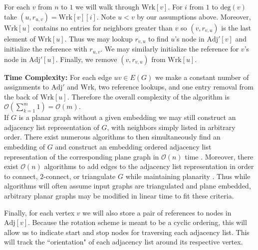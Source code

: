 \documentclass[letterpaper, 12pt]{amsart}
\theoremstyle{definition}
\theoremstyle{definition}
\theoremstyle{thm}
\theoremstyle{definition}
\begin{document}
For each $v$ from $n$ to $1$ we will walk through $\text{Wrk}[v]$. For $i$ from
$1$ to $\text{deg}(v)$ take $(u,r_{u,v})=\text{Wrk}[v][i]$. Note $u<v$ by our
assumptions above. Moreover, $\text{Wrk}[u]$ contains no entries for neighbors
greater than $v$ so $(v,r_{v,u})$ is the last element of $\text{Wrk}[u]$. Thus
we may lookup $r_{v,u}$ to find $u$'s node in $\text{Adj}'[v]$ and initialize the
reference with $r_{u,v}$. We may similarly initialize the reference for $v$'s
node in $\text{Adj}'[u]$. Finally, we remove $(v,r_{v,u})$ from $\text{Wrk}[u]$.

\noindent\textbf{Time Complexity:} For each edge $uv\in E(G)$ we make a constant
number of assignments to $\text{Adj}'$ and $\text{Wrk}$, two reference
lookups, and one entry removal from the back of $\text{Wrk}[u]$.
Therefore the overall complexity of the algorithm is
$\mathcal{O}\left(\sum_{k=1}^m 1\right)=\mathcal{O}(m)$.\\

If $G$ is a planar graph without a given embedding we may still construct an
adjacency list representation of $G$, with neighbors simply listed in arbitrary
order. There exist numerous algorithms to then simultaneously find an embedding
of $G$ and construct an embedding ordered adjacency list representation of the
corresponding plane graph in $\mathcal{O}(n)$ time \cite{tarjan, lempel, boyer,
booth}. Moreover, there exist $\mathcal{O}(n)$ algorithms to add edges
to the adjacency list representation in order to connect, $2$-connect, or
triangulate $G$ while maintaining planarity \cite{hagerup,reed,eswaran}. Thus
while algorithms will often assume input graphs are triangulated and plane
embedded, arbitrary planar graphs may be modified in linear time to fit these
criteria.

Finally, for each vertex $v$ we will also store a pair of references to nodes in
$\text{Adj}[v]$. Because the rotation scheme is meant to be a cyclic ordering,
this will allow us to indicate start and stop nodes for traversing each adjacency
list. This will track the ``orientation" of each adjacency list around its
respective vertex.

\begin{comment}
If $G$ is a $2$-connected weakly triangulated graph with an outer cycle
$C=v_1v_2\ldots v_k$, vertices listed in clockwise order. We shall set the
the neighbor range of $v_i$ such that the start and indices are the indices of
$v_{i-1}$ and $v_{i+1}$ in $A[v_i]$, respectively. These indices are consider
in a cyclic manner, that is we consider $v_{0}=v_k$, $v_1=v_{k+1}$, and so on.
Many of the algorithms considered will work by removing one vertex at a time,
and considering the remaining graph using the maximal $2$-connected
subgraphs. If $v$ on the outer face, we may remove $v$ from $G$ by contracting
the neighbor ranges for its neighboring vertices on the outer face exclude $v$.
Interior neighbors will be If one of the
neighbors of $v$ is a cutvertex once $G$ is removed, we will split into two
\end{comment}
\end{document}
